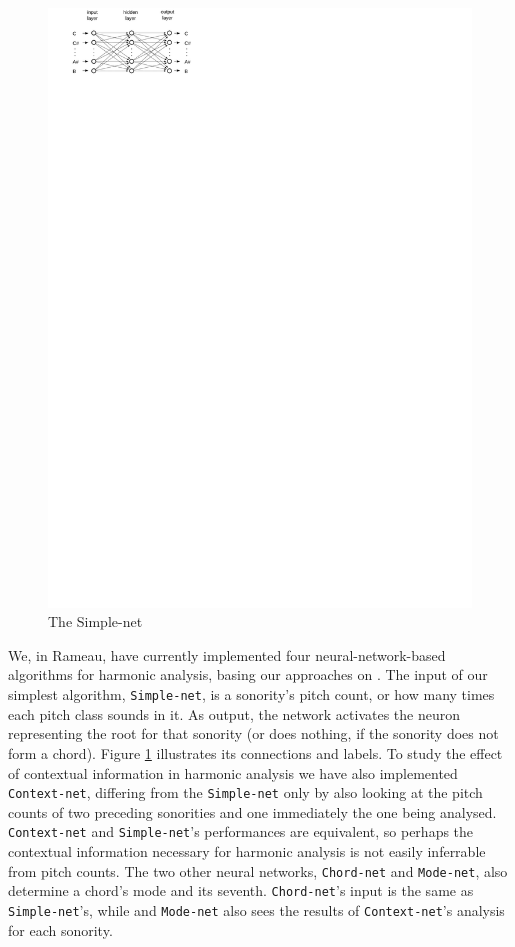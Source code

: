 \documentclass{article}
\begin{document}
\begin{figure}
  \includegraphics[]{neural-networks}
  \caption{The Simple-net}
  \label{fig:simple-net-diagram}
\end{figure}


We, in Rameau, have currently implemented four neural-network-based
algorithms for harmonic analysis, basing our approaches on
\cite{tsui02:_harmon_analy_using_neural_networ}. The input of our
simplest algorithm, \texttt{Simple\hyp{}net}, is a sonority's pitch
count, or how many times each pitch class sounds in it. As output, the
network activates the neuron representing the root for that sonority
(or does nothing, if the sonority does not form a chord).  Figure
\ref{fig:simple-net-diagram} illustrates its connections and labels.
To study the effect of contextual information in harmonic analysis we
have also implemented \texttt{Context-net}, differing from the
\texttt{Simple\hyp{}net} only by also looking at the pitch counts of
two preceding sonorities and one immediately the one being
analysed. \texttt{Context-net} and \texttt{Simple-net}'s performances
are equivalent, so perhaps the contextual information necessary for
harmonic analysis is not easily inferrable from pitch counts. The two
other neural networks, \texttt{Chord-net} and \texttt{Mode-net}, also
determine a chord's mode and its seventh. \texttt{Chord-net}'s input
is the same as \texttt{Sim\-ple\--net}'s, while and \texttt{Mode-net}
also sees the results of \texttt{Context-net}'s analysis for each
sonority.
\end{document}
